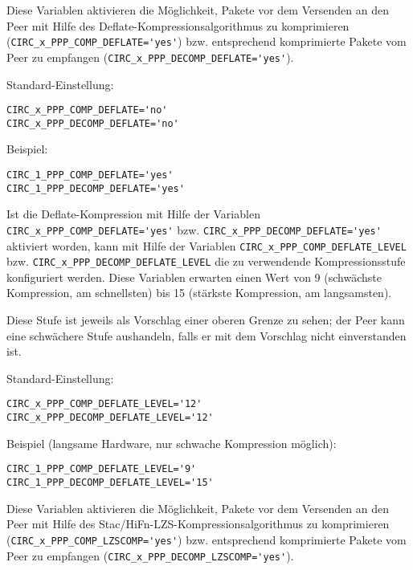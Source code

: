 \begin{description}
Diese Variablen aktivieren die Möglichkeit, Pakete vor dem Versenden an den Peer
mit Hilfe des Deflate-Kompressionsalgorithmus zu komprimieren
(\verb+CIRC_x_PPP_COMP_DEFLATE='yes'+) bzw. entsprechend komprimierte Pakete
vom Peer zu empfangen
(\verb+CIRC_x_PPP_DECOMP_DEFLATE='yes'+).

Standard-Einstellung:

\verb+CIRC_x_PPP_COMP_DEFLATE='no'+\\
\verb+CIRC_x_PPP_DECOMP_DEFLATE='no'+

Beispiel:

\verb+CIRC_1_PPP_COMP_DEFLATE='yes'+\\
\verb+CIRC_1_PPP_DECOMP_DEFLATE='yes'+


Ist die Deflate-Kompression mit Hilfe der Variablen
\verb+CIRC_x_PPP_COMP_DEFLATE='yes'+ bzw. \verb+CIRC_x_PPP_DECOMP_DEFLATE='yes'+
aktiviert worden, kann mit Hilfe der Variablen
\verb+CIRC_x_PPP_COMP_DEFLATE_LEVEL+ bzw. \verb+CIRC_x_PPP_DECOMP_DEFLATE_LEVEL+
die zu verwendende Kompressionsstufe konfiguriert werden. Diese Variablen
erwarten einen Wert von 9 (schwächste Kompression, am schnellsten) bis 15
(stärkste Kompression, am langsamsten).

Diese Stufe ist jeweils als Vorschlag einer oberen Grenze zu sehen; der Peer
kann eine schwächere Stufe aushandeln, falls er mit dem Vorschlag nicht
einverstanden ist.

Standard-Einstellung:

\verb+CIRC_x_PPP_COMP_DEFLATE_LEVEL='12'+\\
\verb+CIRC_x_PPP_DECOMP_DEFLATE_LEVEL='12'+

Beispiel (langsame Hardware, nur schwache Kompression möglich):

\verb+CIRC_1_PPP_COMP_DEFLATE_LEVEL='9'+\\
\verb+CIRC_1_PPP_DECOMP_DEFLATE_LEVEL='15'+


Diese Variablen aktivieren die Möglichkeit, Pakete vor dem Versenden an den Peer
mit Hilfe des Stac/HiFn-LZS-Kompressionsalgorithmus zu komprimieren
(\verb+CIRC_x_PPP_COMP_LZSCOMP='yes'+) bzw. entsprechend komprimierte Pakete vom
Peer zu empfangen (\verb+CIRC_x_PPP_DECOMP_LZSCOMP='yes'+).


\end{description}
